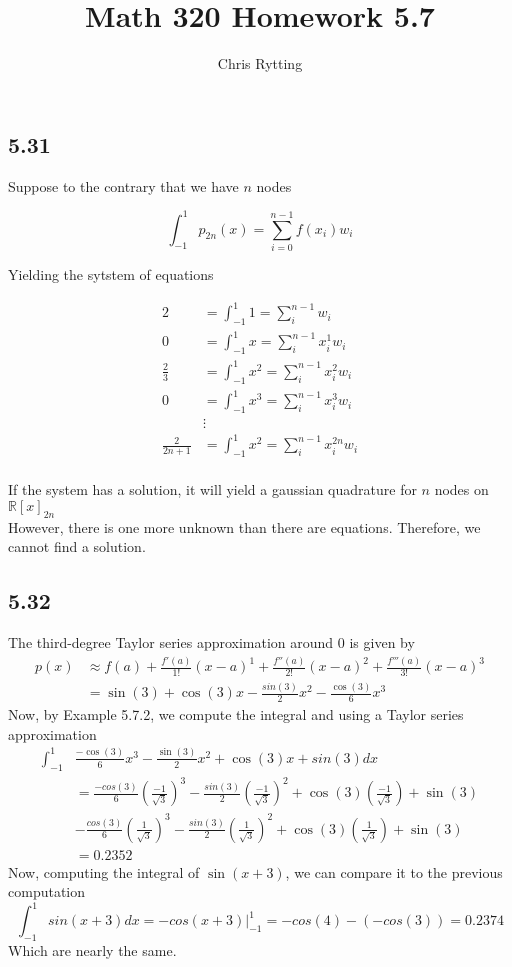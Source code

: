 \documentclass[letterpaper,12pt]{article}
\theoremstyle{definition}
\begin{document}
\title{Math 320 Homework 5.7}
\author{Chris Rytting}
\maketitle

\subsection*{5.31}

Suppose to the contrary that we have $n$ nodes

\[\int_{-1}^1 p_{2n}(x) = \sum_{i=0}^{n-1} f(x_i)w_i\]


Yielding the sytstem of equations

\begin{align*}
   2 &= \int_{-1}^1 1 = \sum_i^{n-1}w_i\\
   0 &= \int_{-1}^1 x = \sum_i^{n-1} x_i^1w_i\\
   \frac{2}{3} &= \int_{-1}^1 x^2 = \sum_i^{n-1} x_i^2w_i\\
   0 &= \int_{-1}^1 x^3= \sum_i^{n-1} x_i^3w_i\\
   &\vdots\\
   \frac{2}{2n+1} &= \int_{-1}^1 x^2 = \sum_i^{n-1} x_i^{2n}w_i\\
\end{align*}

If the system has a solution, it will yield a gaussian quadrature for $n$ nodes on $\mathbb{R}[x]_{2n}$\\



However, there is one more unknown than there are equations. Therefore, we cannot find a solution.

\subsection*{5.32}
The third-degree Taylor series approximation around 0 is given by
\begin{align*}
p(x) &\approx f(a) + \frac{f'(a)}{1!}(x-a)^1 + \frac{f''(a)}{2!}(x-a)^2 +\frac{f'''(a)}{3!}(x-a)^3\\
&=\sin(3) + \cos(3)x - \frac{sin(3)}{2}x^2 - \frac{\cos(3)}{6}x^3
\end{align*}
Now, by Example 5.7.2, we compute the integral and using a Taylor series approximation
\begin{align*}
\int_{-1}^1 & \frac{-\cos(3)}{6}x^3 - \frac{\sin(3)}{2}x^2 + \cos(3)x +sin(3)dx\\
 &= \frac{-cos(3)}{6}(\frac{-1}{\sqrt{3}})^3 - \frac{sin(3)}{2}(\frac{-1}{\sqrt{3}})^2 + \cos(3)(\frac{-1}{\sqrt{3}}) +\sin(3)\\
       &-\frac{cos(3)}{6}(\frac{1}{\sqrt{3}})^3 - \frac{sin(3)}{2}(\frac{1}{\sqrt{3}})^2 + \cos(3)(\frac{1}{\sqrt{3}}) +\sin(3)\\
       &= 0.2352
\end{align*}
Now, computing the integral of $\sin(x+3)$, we can compare it to the previous computation
\[\int_{-1}^1 sin(x+3)dx = -cos(x+3)|_{-1}^1 = -cos(4) - (-cos(3)) = 0.2374\] 
Which are nearly the same.
\end{document}
